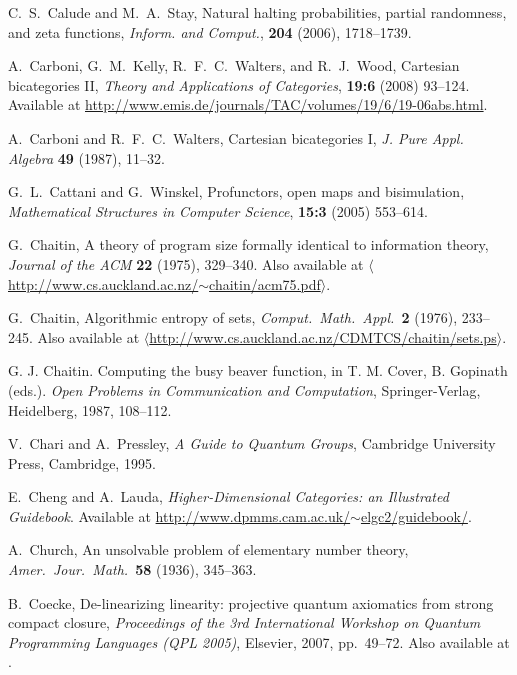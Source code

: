 \documentclass[12pt,twoside,openright]{report}
\begin{document}
\begin{thebibliography}{99}
 C.\ S.\ Calude and M.\ A.\ Stay, Natural halting probabilities, partial randomness, and zeta functions, \textsl{Inform. and Comput.}, \textbf{204} (2006), 
1718--1739. 

 A.\ Carboni, G.\ M.\ Kelly, R.\ F.\ C.\ Walters, and R.\ J.\ Wood, Cartesian bicategories II, \textsl{Theory and Applications of Categories}, {\bf 19:6} (2008) 93--124.  Available at \href{http://www.emis.de/journals/TAC/volumes/19/6/19-06abs.html}{http://www.emis.de/journals/TAC/volumes/19/6/19-06abs.html}.

 A.\ Carboni and R.\ F.\ C.\ Walters, Cartesian bicategories I, \textsl{J. Pure Appl. Algebra} \textbf{49} (1987), 11--32.

 G.\ L.\ Cattani and G.\ Winskel, Profunctors, open maps and bisimulation, \textsl{Mathematical Structures in Computer Science}, \textbf{15:3} (2005) 553--614.

 G.\ Chaitin, A theory of program size formally identical to information theory, {\sl Journal of the ACM} \textbf{22}
(1975), 329--340. Also available at
\href{http://www.cs.auckland.ac.nz/~chaitin/acm75.pdf}
{$\langle$http://www.cs.auckland.ac.nz/$\sim$chaitin/acm75.pdf$\rangle$}.

 G.\ Chaitin, Algorithmic entropy of sets, 
{\sl Comput.\ Math.\ Appl.\ }\textbf{2} (1976), 
233--245.  Also available at \hfill \break
\href{http://www.cs.auckland.ac.nz/CDMTCS/chaitin/sets.ps}
{$\langle$http://www.cs.auckland.ac.nz/CDMTCS/chaitin/sets.ps$\rangle$}.

G. J. Chaitin.  Computing the busy beaver function, in T. M. Cover, B. Gopinath (eds.).  \textsl{Open Problems in Communication and Computation}, Springer-Verlag, Heidelberg, 1987, 108--112.

 V.\ Chari and A.\ Pressley, \textsl{A Guide to Quantum Groups}, Cambridge University Press, Cambridge, 1995.

 E.\ Cheng and A.\ Lauda, \textsl{Higher-Dimensional Categories: an Illustrated Guidebook}.  Available at
\href{http://www.dpmms.cam.ac.uk/~elgc2/guidebook/}
{http://www.dpmms.cam.ac.uk/$\sim$elgc2/guidebook/}.

 A.\ Church, An unsolvable problem of elementary number theory, {\sl Amer.\ Jour.\ Math.\ }{\bf 58} (1936), 345--363.

 B.\ Coecke, De-linearizing linearity: projective quantum axiomatics from strong compact closure, {\sl Proceedings of the 3rd International Workshop on Quantum Programming Languages (QPL 2005)}, Elsevier, 2007, pp.\ 49--72.  Also available at .


\end{thebibliography}
\end{document}
